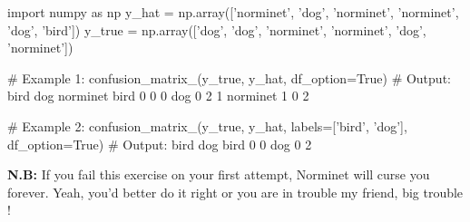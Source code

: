 \documentclass[]{article}
\newenvironment{Shaded}{\begin{snugshade}}{\end{snugshade}}
\newcommand{\CommentTok}[1]{\textcolor[rgb]{0.48,0.49,0.49}{#1}}
\newcommand{\DecValTok}[1]{\textcolor[rgb]{0.96,0.45,0.00}{#1}}
\newcommand{\ImportTok}[1]{\textcolor[rgb]{0.15,0.68,0.38}{#1}}
\newcommand{\NormalTok}[1]{\textcolor[rgb]{0.81,0.81,0.76}{#1}}
\newcommand{\OperatorTok}[1]{\textcolor[rgb]{0.81,0.81,0.76}{#1}}
\newcommand{\StringTok}[1]{\textcolor[rgb]{0.96,0.31,0.31}{#1}}
\newcommand{\VariableTok}[1]{\textcolor[rgb]{0.15,0.68,0.68}{#1}}
\begin{document}
\begin{Shaded}
\begin{Highlighting}[]
\ImportTok{import}\NormalTok{ numpy }\ImportTok{as}\NormalTok{ np}
\NormalTok{y_hat }\OperatorTok{=}\NormalTok{ np.array([}\StringTok{'norminet'}\NormalTok{, }\StringTok{'dog'}\NormalTok{, }\StringTok{'norminet'}\NormalTok{, }\StringTok{'norminet'}\NormalTok{, }\StringTok{'dog'}\NormalTok{, }\StringTok{'bird'}\NormalTok{])}
\NormalTok{y_true }\OperatorTok{=}\NormalTok{ np.array([}\StringTok{'dog'}\NormalTok{, }\StringTok{'dog'}\NormalTok{, }\StringTok{'norminet'}\NormalTok{, }\StringTok{'norminet'}\NormalTok{, }\StringTok{'dog'}\NormalTok{, }\StringTok{'norminet'}\NormalTok{])}

\CommentTok{# Example 1: }
\NormalTok{confusion_matrix_(y_true, y_hat, df_option}\OperatorTok{=}\VariableTok{True}\NormalTok{)}
\CommentTok{# Output:}
\NormalTok{           bird  dog  norminet}
\NormalTok{ bird         }\DecValTok{0}    \DecValTok{0}         \DecValTok{0}
\NormalTok{ dog          }\DecValTok{0}    \DecValTok{2}         \DecValTok{1}
\NormalTok{ norminet     }\DecValTok{1}    \DecValTok{0}         \DecValTok{2}

\CommentTok{# Example 2:}
\NormalTok{confusion_matrix_(y_true, y_hat, labels}\OperatorTok{=}\NormalTok{[}\StringTok{'bird'}\NormalTok{, }\StringTok{'dog'}\NormalTok{], df_option}\OperatorTok{=}\VariableTok{True}\NormalTok{)}
\CommentTok{# Output:}
\NormalTok{           bird  dog}
\NormalTok{ bird         }\DecValTok{0}    \DecValTok{0}
\NormalTok{ dog          }\DecValTok{0}    \DecValTok{2}
\end{Highlighting}
\end{Shaded}

\textbf{N.B:} If you fail this exercise on your first attempt, Norminet
will curse you forever. Yeah, you'd better do it right or you are in
trouble my friend, big trouble !

\clearpage
\end{document}
